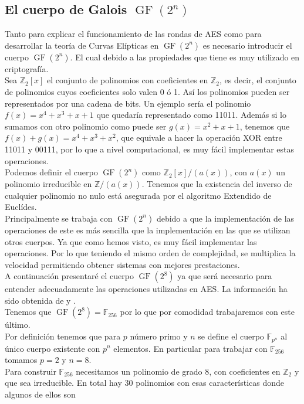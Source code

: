 \subsection{El cuerpo de Galois $\operatorname{GF}(2^n)$}
Tanto para explicar el funcionamiento de las rondas de AES como para desarrollar la teoría de Curvas Elípticas en $\operatorname{GF}(2^n)$ es necesario introducir el cuerpo $\operatorname{GF}(2^n)$. El cual debido a las propiedades que tiene es muy utilizado en criptografía.\\
Sea $\mathbb{Z}_2[x]$ el conjunto de polinomios con coeficientes en $\mathbb{Z}_2$, es decir, el conjunto de polinomios cuyos coeficientes solo valen 0 ó 1. Así los polinomios pueden ser representados por una cadena de bits.
 Un ejemplo sería el polinomio $f(x)=x^4+x^3+x+1$ que quedaría representado como 11011. 
Además si lo sumamos con otro polinomio como puede ser $g(x)=x^2+x+1$, tenemos que $f(x)+g(x)=x^4+x^3+x^2$, que equivale a hacer la operación XOR entre 11011 y 00111, por lo que a nivel computacional, es muy fácil implementar estas operaciones.\\
Podemos definir el cuerpo $\operatorname{GF}(2^n)$ como $\mathbb{Z}_2[x]/(a(x))$, con $a(x)$ un polinomio irreducible en $\mathbb{Z}/(a(x))$. Tenemos que la existencia del inverso de cualquier polinomio no nulo está asegurada por el algoritmo Extendido de Euclídes.\\ 
Principalmente se trabaja con $\operatorname{GF}(2^n)$ debido a que la implementación de las operaciones de este es más sencilla que la implementación en las que se utilizan otros cuerpos. Ya que como hemos visto, es muy fácil implementar las operaciones. Por lo que teniendo el mismo orden de complejidad, se multiplica la velocidad permitiendo obtener sistemas con mejores prestaciones.\\
A continuación presentaré el cuerpo $\operatorname{GF}(2^8)$ ya que será necesario para entender adecuadamente las operaciones utilizadas en AES. La información ha sido obtenida de \cite{criptografia} y \cite{dem1}.\\
Tenemos que $\operatorname{GF}(2^8)=\mathbb{F}_{256}$ por lo que por comodidad trabajaremos con este último.\\
Por definición tenemos que para $p$ número primo y $n$ se define el cuerpo $\mathbb{F}_{p^n}$ al único cuerpo existente con $p^n$ elementos. En particular para trabajar con $\mathbb{F}_{256}$ tomamos $p=2$ y $n=8$.\\
Para construir $\mathbb{F}_{256}$ necesitamos un polinomio de grado 8, con coeficientes en $\mathbb{Z}_2$ y que sea irreducible. En total hay 30 polinomios con esas características donde algunos de ellos son 
